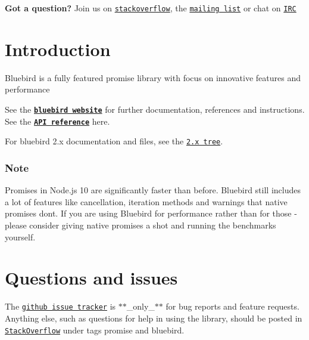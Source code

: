 \href{http://promisesaplus.com/}{\tt }

\href{https://travis-ci.org/petkaantonov/bluebird}{\tt } \href{http://petkaantonov.github.io/bluebird/coverage/debug/index.html}{\tt }

{\bfseries Got a question?} Join us on \href{http://stackoverflow.com/questions/tagged/bluebird}{\tt stackoverflow}, the \href{https://groups.google.com/forum/#!forum/bluebird-js}{\tt mailing list} or chat on \href{https://webchat.freenode.net/?channels=#promises}{\tt I\+RC}

\section*{Introduction}

Bluebird is a fully featured promise library with focus on innovative features and performance

See the \href{http://bluebirdjs.com/docs/getting-started.html}{\tt {\bfseries bluebird website}} for further documentation, references and instructions. See the \href{http://bluebirdjs.com/docs/api-reference.html}{\tt {\bfseries A\+PI reference}} here.

For bluebird 2.\+x documentation and files, see the \href{https://github.com/petkaantonov/bluebird/tree/2.x}{\tt 2.\+x tree}.

\subsubsection*{Note}

Promises in Node.\+js 10 are significantly faster than before. Bluebird still includes a lot of features like cancellation, iteration methods and warnings that native promises don\textquotesingle{}t. If you are using Bluebird for performance rather than for those -\/ please consider giving native promises a shot and running the benchmarks yourself.

\section*{Questions and issues}

The \href{https://github.com/petkaantonov/bluebird/issues}{\tt github issue tracker} is $\ast$$\ast$\+\_\+only\+\_\+$\ast$$\ast$ for bug reports and feature requests. Anything else, such as questions for help in using the library, should be posted in \href{http://stackoverflow.com/questions/tagged/bluebird}{\tt Stack\+Overflow} under tags {\ttfamily promise} and {\ttfamily bluebird}.

